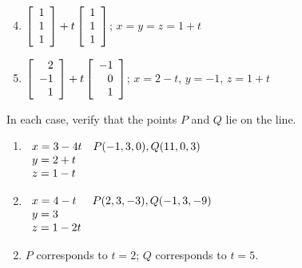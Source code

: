 \begin{multicols}{2}
\begin{ex}
\begin{sol}
\begin{enumerate}[label={\alph*.}]
\setcounter{enumi}{3}
\item
$\left[
\begin{array}{r}
1\\
1\\
1
\end{array}
\right]
+ t
\left[
\begin{array}{r}
1\\
1\\
1
\end{array}
\right]$;
$x = y = z = 1 + t$

\setcounter{enumi}{5}
\item 
$\left[
\begin{array}{r}
2\\
-1\\
1
\end{array}
\right]
+ t
\left[
\begin{array}{r}
-1\\
0\\
1
\end{array}
\right]$;
$x = 2 - t$, $y = -1$, $z = 1 + t$

\end{enumerate}
\end{sol}
\end{ex}

\begin{ex}
In each case, verify that the points $P$ and $Q$ lie on the line.

\begin{enumerate}[label={\alph*.}]
\item 
$\begin{array}[t]{ll}
x = 3 - 4t & P(-1,3,0), Q(11,0,3) \\
y = 2 + t & \\
z = 1 - t &
\end{array}
$

\item
$\begin{array}[t]{ll}
x = 4 - t & P(2,3,-3), Q(-1,3,-9) \\
y = 3 & \\
z = 1 - 2t &
\end{array}
$

\end{enumerate}
\begin{sol}
\begin{enumerate}[label={\alph*.}]
\setcounter{enumi}{1}
\item  $P$ corresponds to $t = 2$; $Q$ corresponds to $t = 5$.


\end{enumerate}
\end{sol}
\end{ex}
\end{multicols}
